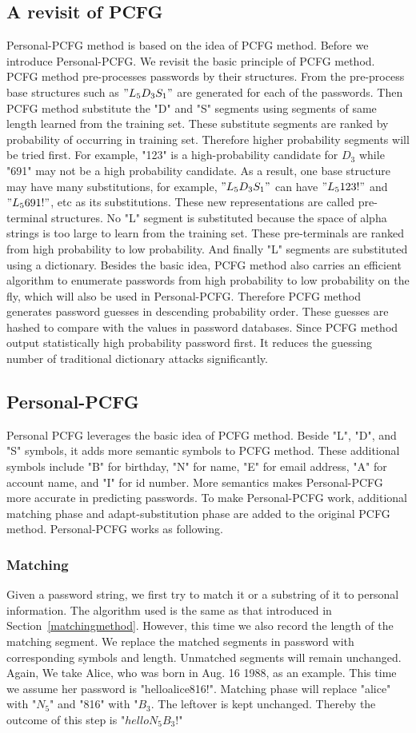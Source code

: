 \documentclass{sig-alternate}
\begin{document}
\subsection{A revisit of PCFG}
Personal-PCFG method is based on the idea of PCFG method. Before we introduce Personal-PCFG. We revisit the basic principle of PCFG method. PCFG method pre-processes passwords by their structures. From the pre-process base structures such as $"L_5D_3S_1"$ are generated for each of the passwords. Then PCFG method substitute the "D" and "S" segments using segments of same length learned from the training set. These substitute segments are ranked by probability of occurring in training set. Therefore higher probability segments will be tried first. For example, "123" is a high-probability candidate for $D_3$ while "691" may not be a high probability candidate. As a result, one base structure may have many substitutions, for example, $"L_5D_3S_1"$ can have $"L_5123!"$ and $"L_5691!"$, etc as its substitutions. These new representations are called pre-terminal structures. No "L" segment is substituted because the space of alpha strings is too large to learn from the training set. These pre-terminals are ranked from high probability to low probability. And finally "L" segments are substituted using a dictionary. Besides the basic idea, PCFG method also carries an efficient algorithm to enumerate passwords from high probability to low probability on the fly, which will also be used in Personal-PCFG. Therefore PCFG method generates password guesses in descending probability order. These guesses are hashed to compare with the values in password databases. Since PCFG method output statistically high probability password first. It reduces the guessing number of traditional dictionary attacks significantly. 

\subsection{Personal-PCFG}
Personal PCFG leverages the basic idea of PCFG method. Beside "L", "D", and "S" symbols, it adds more semantic symbols to PCFG method. These additional symbols include "B" for birthday, "N" for name, "E" for email address, "A" for account name, and "I" for id number. More semantics makes Personal-PCFG more accurate in predicting passwords. To make Personal-PCFG work, additional matching phase and adapt-substitution phase are added to the original PCFG method. Personal-PCFG works as following.
\subsubsection{Matching}
Given a password string, we first try to match it or a substring of it to personal information. The algorithm used is the same as that introduced in Section~\ref{matchingmethod}. However, this time we also record the length of the matching segment. We replace the matched segments in password with corresponding symbols and length. Unmatched segments will remain unchanged. Again, We take Alice, who was born in Aug. 16 1988, as an example. This time we assume her password is "helloalice816!". Matching phase will replace "alice" with "$N_5$" and "816" with "$B_3$. The leftover is kept unchanged. Thereby the outcome of this step is "$helloN_5B_3!$" 
\end{document}
